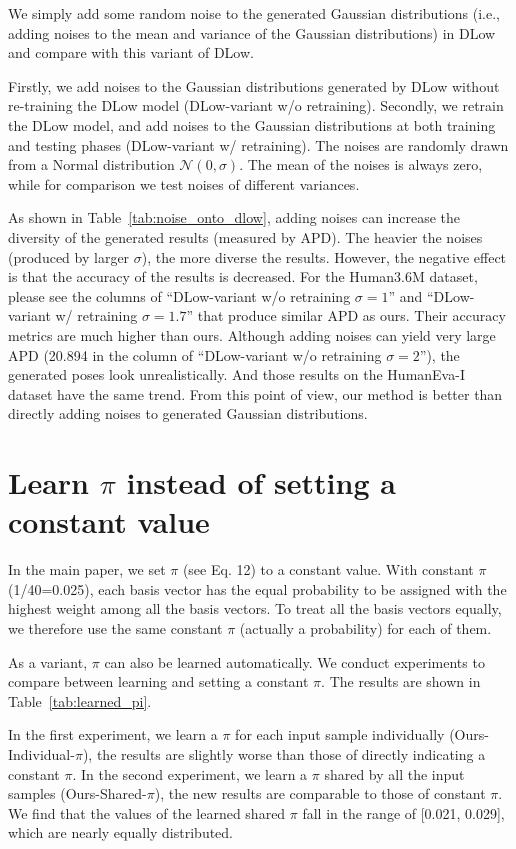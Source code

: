 \documentclass[sigconf,screen,nonacm]{acmart}
\begin{document}
	We simply add some random noise to the generated Gaussian distributions (i.e., adding noises to the mean and variance of the Gaussian distributions) in DLow \cite{yuan2020dlow} and compare with this variant of DLow.
	




	Firstly, we add noises to the Gaussian distributions generated by DLow without re-training the DLow model (DLow-variant w/o retraining). Secondly, we retrain the DLow model, and add noises to the Gaussian distributions at both training and testing phases (DLow-variant w/ retraining). The noises are randomly drawn from a Normal distribution $\mathcal{N}(0,\sigma)$. The mean of the noises is always zero, while for comparison we test noises of different variances.
	
	As shown in Table~\ref{tab:noise_onto_dlow}, adding noises can increase the diversity of the generated results (measured by APD). The heavier the noises (produced by larger $\sigma$), the more diverse the results. However, the negative effect is that the accuracy of the results is decreased. For the Human3.6M dataset, please see the columns of ``DLow-variant w/o retraining $\sigma=1$'' and ``DLow-variant w/ retraining $\sigma=1.7$'' that produce similar APD as ours. Their accuracy metrics are much higher than ours. Although adding noises can yield very large APD (20.894 in the column of ``DLow-variant w/o retraining $\sigma=2$''), the generated poses look unrealistically. And those results on the HumanEva-I dataset have the same trend. From this point of view, our method is better than directly adding noises to generated Gaussian distributions.
	
	\section{Learn $\pi$ instead of setting a constant value}
	In the main paper, we set $\pi$ (see Eq. 12) to a constant value. With constant $\pi$ (1/40=0.025), each basis vector has the equal probability to be assigned with the highest weight among all the basis vectors. To treat all the basis vectors equally, we therefore use the same constant $\pi$ (actually a probability) for each of them.
	
	As a variant, $\pi$ can also be learned automatically. We conduct experiments to compare between learning and setting a constant $\pi$. The results are shown in Table~\ref{tab:learned_pi}.
	
	
	In the first experiment, we learn a $\pi$ for each input sample individually (Ours-Individual-$\pi$), the results are slightly worse than those of directly indicating a constant $\pi$. In the second experiment, we learn a $\pi$ shared by all the input samples (Ours-Shared-$\pi$), the new results are comparable to those of constant $\pi$. We find that the values of the learned shared $\pi$ fall in the range of [0.021, 0.029], which are nearly equally distributed.
	
\end{document}
